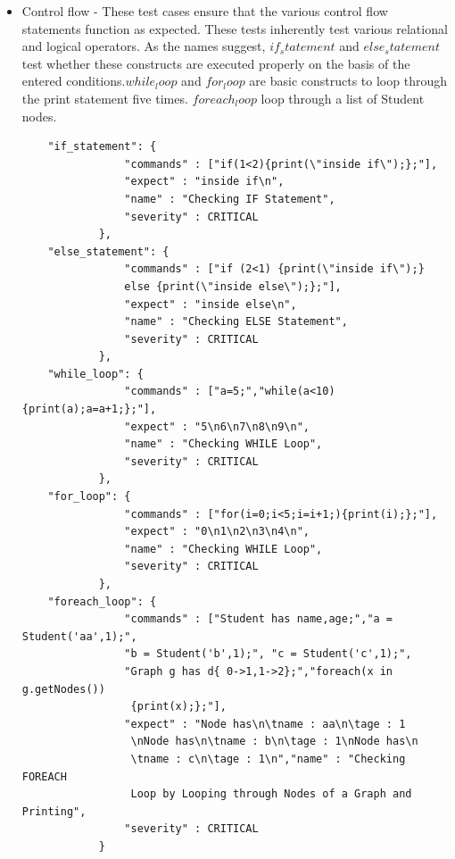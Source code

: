 \documentclass[a4paper]{article}
\begin{document}
\begin{itemize}
\item Control flow - These test cases ensure that the various control flow statements function as expected. These tests inherently test various relational and logical operators. As the names suggest, $if_statement$ and $else_statement$ test whether these constructs are executed properly on the basis of the entered conditions.$while_loop$ and $for_loop$ are basic constructs to loop through the print statement five times. $foreach_loop$ loop through a list of Student nodes.
\begin{verbatim}
	"if_statement": { 
                "commands" : ["if(1<2){print(\"inside if\");};"],
                "expect" : "inside if\n",
                "name" : "Checking IF Statement",
                "severity" : CRITICAL
            },
    "else_statement": { 
                "commands" : ["if (2<1) {print(\"inside if\");}
                else {print(\"inside else\");};"],
                "expect" : "inside else\n",
                "name" : "Checking ELSE Statement",
                "severity" : CRITICAL
            },
    "while_loop": { 
                "commands" : ["a=5;","while(a<10){print(a);a=a+1;};"],
                "expect" : "5\n6\n7\n8\n9\n",
                "name" : "Checking WHILE Loop",
                "severity" : CRITICAL
            },
    "for_loop": { 
                "commands" : ["for(i=0;i<5;i=i+1;){print(i);};"],
                "expect" : "0\n1\n2\n3\n4\n",
                "name" : "Checking WHILE Loop",
                "severity" : CRITICAL
            },
    "foreach_loop": { 
                "commands" : ["Student has name,age;","a = Student('aa',1);",
                "b = Student('b',1);", "c = Student('c',1);",
                "Graph g has d{ 0->1,1->2};","foreach(x in g.getNodes())
                 {print(x);};"],
                "expect" : "Node has\n\tname : aa\n\tage : 1
                 \nNode has\n\tname : b\n\tage : 1\nNode has\n
                 \tname : c\n\tage : 1\n","name" : "Checking FOREACH
                 Loop by Looping through Nodes of a Graph and Printing",
                "severity" : CRITICAL
            }
\end{verbatim}


\end{itemize}
\end{document}
